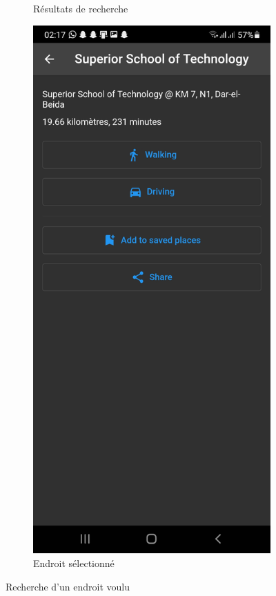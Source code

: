 \begin{figure}[!htbp]
\begin{subfigure}{.3\linewidth}
         \caption{Résultats de recherche}
    \end{subfigure}
    \hfill
    \begin{subfigure}{.3\linewidth}
        \centering
         \includegraphics[width=\textwidth]{assets/app/search/infos.jpg}
         \caption{Endroit sélectionné}
    \end{subfigure}
    \caption{Recherche d'un endroit voulu}
\end{figure}

